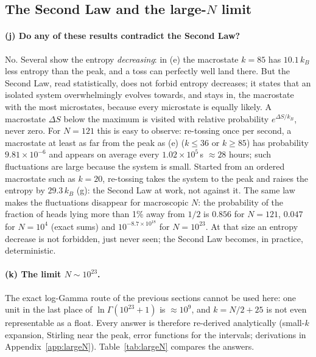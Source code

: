 \subsection{The Second Law and the \texorpdfstring{large-$N$}{large-N} limit}

\paragraph{(j) Do any of these results contradict the Second Law?} No. Several show the entropy \emph{decreasing}: in (e) the macrostate $k=85$ has $10.1\,k_B$ less entropy than the peak, and a toss can perfectly well land there. But the Second Law, read statistically, does not forbid entropy decreases; it states that an isolated system overwhelmingly evolves towards, and stays in, the macrostate with the most microstates, because every microstate is equally likely. A macrostate $\Delta S$ below the maximum is visited with relative probability $e^{\Delta S/k_B}$, never zero. For $N=121$ this is easy to observe: re-tossing once per second, a macrostate at least as far from the peak as (e) ($k\le36$ or $k\ge85$) has probability $9.81\times10^{-6}$ and appears on average every $1.02\times10^{5}$\,s $\approx28$ hours; such fluctuations are large because the system is small. Started from an ordered macrostate such as $k=20$, re-tossing takes the system to the peak and raises the entropy by $29.3\,k_B$ (g): the Second Law at work, not against it. The same law makes the fluctuations disappear for macroscopic $N$: the probability of the fraction of heads lying more than 1\% away from $1/2$ is $0.856$ for $N=121$, $0.047$ for $N=10^4$ (exact sums) and $10^{-8.7\times10^{18}}$ for $N=10^{23}$. At that size an entropy decrease is not forbidden, just never seen; the Second Law becomes, in practice, deterministic.

\paragraph{(k) The limit $N\sim10^{23}$.} The exact log-Gamma route of the previous sections cannot be used here: one unit in the last place of $\ln\Gamma(10^{23}+1)$ is $\approx10^9$, and $k=N/2+25$ is not even representable as a float. Every answer is therefore re-derived analytically (small-$k$ expansion, Stirling near the peak, error functions for the intervals; derivations in Appendix~\ref{app:largeN}). Table~\ref{tab:largeN} compares the answers.

